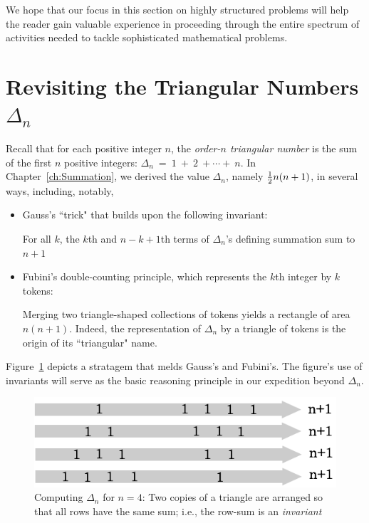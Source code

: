 \smallskip

We hope that our focus in this section on highly structured problems will help the reader gain valuable experience in proceeding through the entire spectrum of activities needed to tackle sophisticated mathematical problems.


\section{Revisiting the Triangular Numbers $\Delta_n$}

 

Recall that for each positive integer $n$, the {\it order-$n$ triangular number} is the sum of the  first $n$ positive integers: $\Delta_n \ = \ 1 \ + \ 2 \ + \cdots + \ n$.  In Chapter~\ref{ch:Summation}, we derived the value $\Delta_n$, namely ${1 \over 2}n(n+1)$, in several ways, including, notably,
\begin{itemize}
\item
Gauss's ``trick" that builds upon the following invariant: 

For all $k$, the $k$th and $n-k+1$th terms of $\Delta_n$'s defining summation sum to $n+1$ 
\item 
Fubini's double-counting principle, which represents the $k$th integer by $k$ tokens:

Merging two triangle-shaped collections of tokens yields a rectangle of area $n(n+1)$.  Indeed, the representation of $\Delta_n$ by a triangle of tokens is the origin of its ``triangular" name.
\end{itemize}
Figure~\ref{fig:Tetrahedral2} depicts a stratagem that melds Gauss's and Fubini's.  The figure's use of invariants will serve as the basic reasoning principle in our expedition beyond $\Delta_n$.
\begin{figure}[h]
\begin{center}
        \includegraphics[scale=0.35]{FiguresArithmetic/appTetrahedral2}
        \caption{Computing $\Delta_n$ for $n=4$: Two copies of a triangle are arranged so that all rows have the same sum; i.e., the row-sum is an {\em invariant}}
        \label{fig:Tetrahedral2}
\end{center}
\end{figure}



